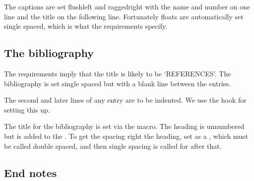 The captions are set flushleft and raggedright with the name and number
on one line and the title on the following line. Fortunately floats are 
automatically set single spaced, which is what the requirements specify.

\begin{lcode}
\captiontitlefont{\normalfont}%
\precaption{\raggedright}%
\captiondelim{\newline}%
\captionstyle{\raggedright}%
\setlength{\belowcaptionskip}{\onelineskip}
\end{lcode}

\subsection{The bibliography}

    The requirements imply that the title is likely to be `REFERENCES'. 
The bibliography is set single spaced but with a blank line between
the entries. 

\begin{lcode}
\renewcommand*{\bibname}{REFERENCES}
\setlength{\bibitemsep}{\onelineskip}
\end{lcode}

    The second and later lines of any entry are to be indented. We use the
\cmd{\biblistextra} hook for setting this up.
\begin{lcode}
\renewcommand*{\biblistextra}{%
  \setlength{\itemsep}{\bibitemsep}
  \setlength{\labelwidth}{0pt}
  \setlength{\leftmargin}{3em}%
  \setlength{\itemindent}{-\leftmargin}}
\end{lcode}

The title for the bibliography is set via the \cmd{\bibsection} macro.
The heading is unnumbered but is added to the \toc. To get the spacing
right the heading, set as a , which must be called double spaced,
and then single spacing is called for after that.
\begin{lcode}
\renewcommand*{\bibsection}{%
  \AsuSpacing
  \chapter*{\bibname}\addcontentsline{toc}{chapter}{\bibname}
  \SingleSpacing}
\end{lcode}


\subsection{End notes}

